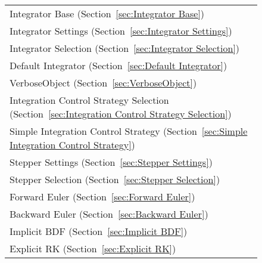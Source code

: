 \begin{figure} 
\centering{} 
  \begin{tabular}{p{}}
\hspace*{0in} Integrator Base (Section~\ref{sec:Integrator Base})
    \index{Integrator Base} \\ 
\hspace*{0.2in} Integrator Settings (Section~\ref{sec:Integrator Settings})
    \index{Integrator Settings} \\ 
\hspace*{0.4in} Integrator Selection (Section~\ref{sec:Integrator Selection})
    \index{Integrator Selection} \\ 
\hspace*{0.6in} Default Integrator (Section~\ref{sec:Default Integrator})
    \index{Default Integrator} \\ 
\hspace*{0.8in} VerboseObject (Section~\ref{sec:VerboseObject})
    \index{VerboseObject} \\ 
\hspace*{0.2in} Integration Control Strategy Selection (Section~\ref{sec:Integration Control Strategy Selection})
    \index{Integration Control Strategy Selection} \\ 
\hspace*{0.4in} Simple Integration Control Strategy (Section~\ref{sec:Simple Integration Control Strategy})
    \index{Simple Integration Control Strategy} \\ 
\hspace*{0.2in} Stepper Settings (Section~\ref{sec:Stepper Settings})
    \index{Stepper Settings} \\ 
\hspace*{0.4in} Stepper Selection (Section~\ref{sec:Stepper Selection})
    \index{Stepper Selection} \\ 
\hspace*{0.6in} Forward Euler (Section~\ref{sec:Forward Euler})
    \index{Forward Euler} \\ 
\hspace*{0.6in} Backward Euler (Section~\ref{sec:Backward Euler})
    \index{Backward Euler} \\ 
\hspace*{0.6in} Implicit BDF (Section~\ref{sec:Implicit BDF})
    \index{Implicit BDF} \\ 
\hspace*{0.6in} Explicit RK (Section~\ref{sec:Explicit RK})
    \index{Explicit RK} \\ 

\end{tabular}
\end{figure}
